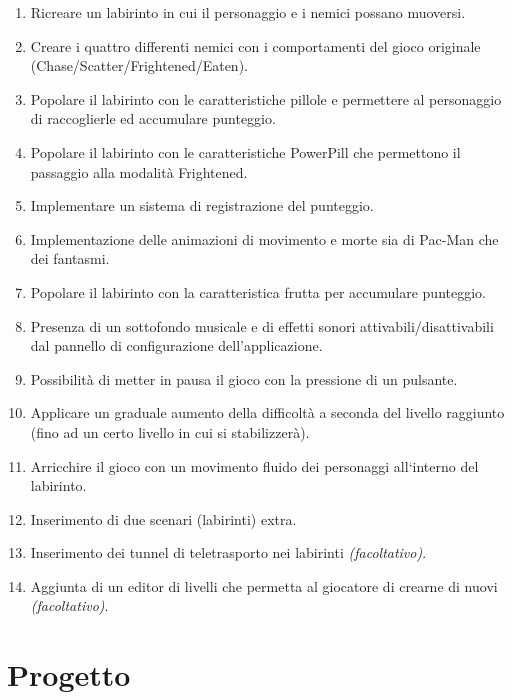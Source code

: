\documentclass[12pt,a4paper]{report}
\begin{document}
\begin{enumerate}
  \item Ricreare un labirinto in cui il personaggio e i nemici possano muoversi.
  \item Creare i quattro differenti nemici con i comportamenti del gioco originale (Chase/Scatter/Frightened/Eaten).
  \item Popolare il labirinto con le caratteristiche pillole e permettere al personaggio di raccoglierle ed accumulare punteggio.
  \item Popolare il labirinto con le caratteristiche PowerPill che permettono il passaggio alla modalità Frightened.
  \item Implementare un sistema di registrazione del punteggio.
  \item Implementazione delle animazioni di movimento e morte sia di Pac-Man che dei fantasmi.
  \item Popolare il labirinto con la caratteristica frutta per accumulare punteggio.
  \item Presenza di un sottofondo musicale e di effetti sonori attivabili/disattivabili dal pannello di configurazione dell’applicazione.
  \item Possibilità di metter in pausa il gioco con la pressione di un pulsante.
  \item Applicare un graduale aumento della difficoltà a seconda del livello raggiunto (fino ad un certo livello in cui si stabilizzerà).
  \item Arricchire il gioco con un movimento fluido dei personaggi all`interno del labirinto.
  \item Inserimento di due scenari (labirinti) extra.
  \item Inserimento dei tunnel di teletrasporto nei labirinti \textit{(facoltativo)}.
  \item Aggiunta di un editor di livelli che permetta al giocatore di crearne di nuovi \textit{(facoltativo)}.
\end{enumerate}



\chapter{Progetto}\label{ch:prog}

\end{document}
